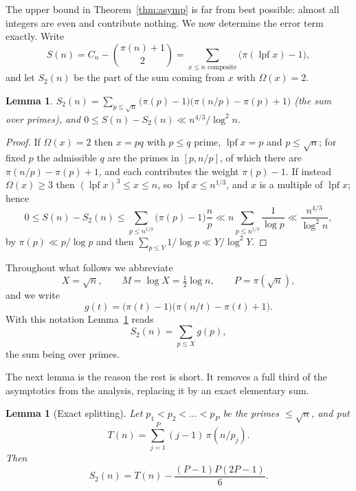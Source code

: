 \documentclass[a4paper,11pt,oneside,reqno]{amsart}
\theoremstyle{definition}
\theoremstyle{remark}
\theoremstyle{plain}
\newtheorem{lemma}[definition]{Lemma}
\newcommand{\lpf}{\operatorname{lpf}}
\newcommand{\Om}{\Omega}
\begin{document}
The upper bound in Theorem~\ref{thm:asymp} is far from best possible: almost
all integers are even and contribute nothing. We now determine the error term
exactly. Write
\begin{equation}\label{eq:Sdef}
  S(n) = C_n-\binom{\pi(n)+1}{2}
      =\sum_{x \le n\text{ composite}}\bigl(\pi(\lpf x)-1\bigr),
\end{equation}
and let \(S_2(n)\) be the part of the sum coming from \(x\) with \(\Om(x) = 2\).

\begin{lemma}\label{lem:semiprime}
  \(\displaystyle
    S_2(n) = \sum_{p \le \sqrt n}\bigl(\pi(p)-1\bigr)
             \bigl(\pi(n/p)-\pi(p)+1\bigr)\)
  (the sum over primes), and
  \(0 \le S(n)-S_2(n)\ll n^{4/3}/\log^{2}n\).
\end{lemma}

\begin{proof}
  If \(\Om(x) = 2\) then \(x = pq\) with \(p \le q\) prime, \(\lpf x = p\) and
  \(p \le \sqrt n\); for fixed \(p\) the admissible \(q\) are the primes in
  \([p,n/p]\), of which there are \(\pi(n/p)-\pi(p)+1\), and each contributes
  the weight \(\pi(p)-1\). If instead \(\Om(x) \ge 3\) then
  \((\lpf x)^{3} \le x \le n\), so \(\lpf x \le n^{1/3}\), and \(x\) is a multiple
  of \(\lpf x\); hence
  \[
    0 \le S(n)-S_2(n) \le \sum_{p \le n^{1/3}}\bigl(\pi(p)-1\bigr)\frac{n}{p}
    \ll n\sum_{p \le n^{1/3}}\frac 1{\log p}\ll\frac{n^{4/3}}{\log^{2}n},
  \]
  by \(\pi(p)\ll p/\log p\) and then
  \(\sum_{p \le Y}1/\log p\ll Y/\log^{2}Y\).
\end{proof}

Throughout what follows we abbreviate
\begin{equation}\label{eq:XM}
  X = \sqrt n,\qquad M = \log X = \tfrac{1}{2}\log n,\qquad P = \pi(\sqrt n),
\end{equation}
and we write
\begin{equation}\label{eq:gdef}
  g(t) = \bigl(\pi(t)-1\bigr)\bigl(\pi(n/t)-\pi(t)+1\bigr).
\end{equation}
With this notation Lemma~\ref{lem:semiprime} reads
\begin{equation}\label{eq:S2asg}
  S_2(n) = \sum_{p \le X}g(p),
\end{equation}
the sum being over primes.

The next lemma is the reason the rest is short. It removes a full third of the
asymptotics from the analysis, replacing it by an exact elementary sum.

\begin{lemma}[Exact splitting]\label{lem:split}
  Let \(p_1 < p_2 < \dots < p_P\) be the primes \(\le \sqrt n\), and put
  \begin{equation}\label{eq:Tdef}
    T(n) = \sum_{j = 1}^{P}(j-1)\,\pi(n/p_j).
  \end{equation}
  Then
  \begin{equation}\label{eq:split-exact}
    S_2(n) = T(n)-\frac{(P-1)P(2P-1)}{6}.
  \end{equation}
\end{lemma}
\end{document}
